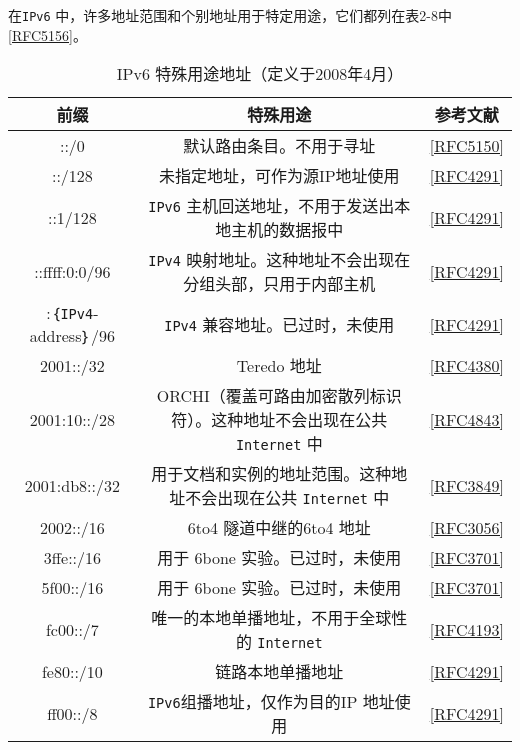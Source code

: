 在\verb|IPv6| 中，许多地址范围和个别地址用于特定用途，它们都列在表2-8中\href{https://www.rfc-editor.org/rfc/rfc5156}{[RFC5156]}。

\begin{table}[H]
    \centering
    \caption{IPv6 特殊用途地址（定义于2008年4月）}
    \begin{tabular}{c|c|c}
        \hline
        前缀	&	特殊用途	&	参考文献  \\ \hline
        ::/0	&	默认路由条目。不用于寻址	&	\href{https://www.rfc-editor.org/rfc/rfc5150}{[RFC5150]}  \\ \hline
        ::/128	&	未指定地址，可作为源IP地址使用	&	\href{https://www.rfc-editor.org/rfc/rfc4291}{[RFC4291]}  \\ \hline
        ::1/128	&	\verb|IPv6| 主机回送地址，不用于发送出本地主机的数据报中	&	\href{https://www.rfc-editor.org/rfc/rfc4291}{[RFC4291]}  \\ \hline
        ::ffff:0:0/96	&	\verb|IPv4| 映射地址。这种地址不会出现在分组头部，只用于内部主机	&	\href{https://www.rfc-editor.org/rfc/rfc4291}{[RFC4291]}  \\ \hline
        :｛\verb|IPv4|-address｝/96	&	\verb|IPv4| 兼容地址。已过时，未使用	&	\href{https://www.rfc-editor.org/rfc/rfc4291}{[RFC4291]}  \\ \hline
        2001::/32	&	Teredo 地址	&	\href{https://www.rfc-editor.org/rfc/rfc4380}{[RFC4380]}  \\ \hline
        2001:10::/28	&	ORCHI（覆盖可路由加密散列标识符）。这种地址不会出现在公共 \verb|Internet| 中	&	\href{https://www.rfc-editor.org/rfc/rfc4843}{[RFC4843]}  \\ \hline
        2001:db8::/32	&	用于文档和实例的地址范围。这种地址不会出现在公共 \verb|Internet| 中	&	\href{https://www.rfc-editor.org/rfc/rfc3849}{[RFC3849]}  \\ \hline
        2002::/16	&	6to4 隧道中继的6to4 地址	&	\href{https://www.rfc-editor.org/rfc/rfc3056}{[RFC3056]}  \\ \hline
        3ffe::/16	&	用于 6bone 实验。已过时，未使用	&	\href{https://www.rfc-editor.org/rfc/rfc3701}{[RFC3701]}  \\ \hline
        5f00::/16	&	用于 6bone 实验。已过时，未使用	&	\href{https://www.rfc-editor.org/rfc/rfc3701}{[RFC3701]}  \\ \hline
        fc00::/7	&	唯一的本地单播地址，不用于全球性的 \verb|Internet|	&	\href{https://www.rfc-editor.org/rfc/rfc4193}{[RFC4193]}  \\ \hline
        fe80::/10	&	链路本地单播地址	&	\href{https://www.rfc-editor.org/rfc/rfc4291}{[RFC4291]}  \\ \hline
        ff00::/8	&	\verb|IPv6|组播地址，仅作为目的IP 地址使用	&	\href{https://www.rfc-editor.org/rfc/rfc4291}{[RFC4291]}  \\ \hline
    \end{tabular}
\end{table}

